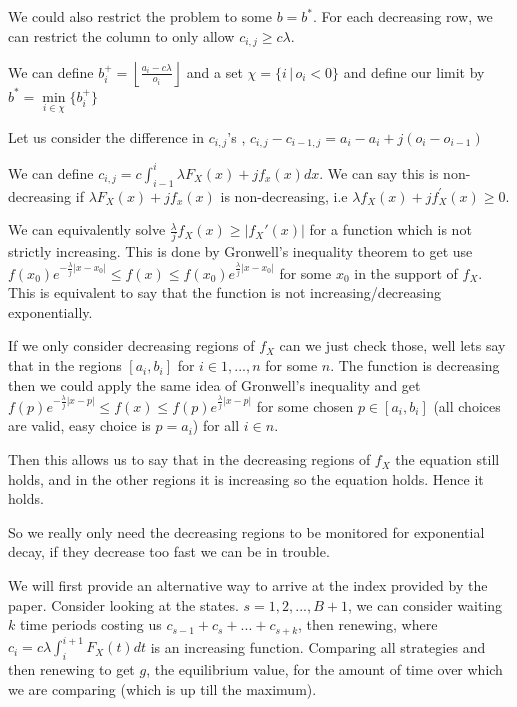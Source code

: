 \documentclass[a4paper,10pt]{article}
\newcommand{\floor}[1]{\left \lfloor #1 \right \rfloor}
\theoremstyle{definition}
\theoremstyle{definition}
\theoremstyle{remark}
\theoremstyle{definition}
\begin{document}
We could also restrict the problem to some $b=b^{*}$. For each decreasing row, we can restrict the column to only allow $c_{i,j} \geq c \lambda$.

We can define $b_{i}^{+}=\floor{\frac{a_{i}-c \lambda}{o_{i}}}$ and a set $\chi=\{i \, | \, o_{i}<0 \}$ and define our limit by $b^{*}=\min\limits_{i \in \chi} \{b_{i}^{+} \}$

Let us consider the difference in $c_{i,j}$'s , $c_{i,j}-c_{i-1,j}=a_{i}-a_{i}+j(o_{i}-o_{i-1})$

We can define $c_{i,j}=c \int_{i-1}^{i} \lambda F_{X}(x)+j f_{x}(x) dx$. We can say this is non-decreasing if $\lambda F_{X}(x)+ j f_{x}(x)$ is non-decreasing, i.e $\lambda f_{X}(x) + j f^{'}_{{X}}(x) \geq 0$.


We can equivalently solve $\frac{\lambda}{j}f_{X}(x) \geq |f_{X}'(x)|$ for a function which is not strictly increasing. This is done by Gronwell's inequality theorem to get use $f(x_{0})e^{-\frac{\lambda}{j}|x-x_{0}|} \leq f(x) \leq f(x_{0})e^{\frac{\lambda}{j}|x-x_{0}|}$ for some $x_{0}$ in the support of $f_{X}$. This is equivalent to say that the function is not increasing/decreasing exponentially.

If we only consider decreasing regions of $f_{X}$ can we just check those, well lets say that in the regions $[a_{i},b_{i}]$ for $i \in {1,...,n}$ for some $n$. The function is decreasing then we could apply the same idea of Gronwell's inequality and get $f(p)e^{-\frac{\lambda}{j}|x-p|} \leq f(x) \leq f(p)e^{\frac{\lambda}{j}|x-p|}$ for some chosen $p \in [a_{i},b_{i}]$ (all choices are valid, easy choice is $p=a_{i}$) for all $i \in n$.

Then this allows us to say that in the decreasing regions of $f_{X}$ the equation still holds, and in the other regions it is increasing so the equation holds. Hence it holds.

So we really only need the decreasing regions to be monitored for exponential decay, if they decrease too fast we can be in trouble.

We will first provide an alternative way to arrive at the index provided by the paper. Consider looking at the states. $s=1,2,...,B+1$, we can consider waiting $k$ time periods costing us $c_{s-1}+c_{s}+...+c_{s+k}$, then renewing, where $c_{i}=c \lambda \int_{i}^{i+1} F_{X}(t) dt$ is an increasing function. Comparing all strategies and then renewing to get $g$, the equilibrium value, for the amount of time over which we are comparing (which is up till the maximum).
\end{document}
